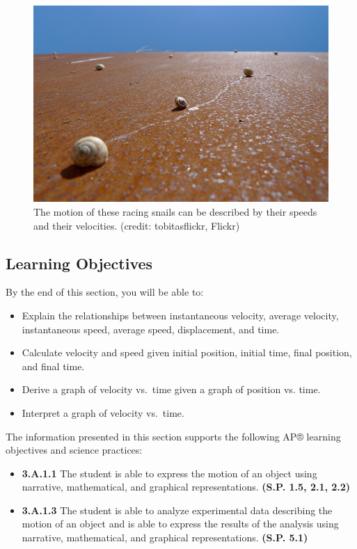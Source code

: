\documentclass[
]{book}
\providecommand{\tightlist}{%
  \setlength{\itemsep}{0pt}\setlength{\parskip}{0pt}}
\newenvironment{learning-objectives}{}{}
\begin{document}
\begin{figure}
\hypertarget{import-auto-id1690049}{%
\centering
\includegraphics{images/Picture 6.png}
\caption{The motion of these racing snails can be described by their speeds and
their velocities. (credit: tobitasflickr,
Flickr)}\label{import-auto-id1690049}
}
\end{figure}

\hypertarget{fs-id1037368}{}
\begin{learning-objectives}

\hypertarget{learning-objectives-2}{%
\subsection{Learning Objectives}\label{learning-objectives-2}}

By the end of this section, you will be able to:

\begin{itemize}
\tightlist
\item
  Explain the relationships between instantaneous velocity, average
  velocity, instantaneous speed, average speed, displacement, and
  time.
\item
  Calculate velocity and speed given initial position, initial time,
  final position, and final time.
\item
  Derive a graph of velocity vs.~time given a graph of position vs.
  time.
\item
  Interpret a graph of velocity vs.~time.
\end{itemize}

The information presented in this section supports the following AP®
learning objectives and science practices:

\begin{itemize}
\tightlist
\item
  \textbf{3.A.1.1} The student is able to express the motion of an object
  using narrative, mathematical, and graphical representations.
  \textbf{(S.P. 1.5, 2.1, 2.2)}
\item
  \textbf{3.A.1.3} The student is able to analyze experimental data
  describing the motion of an object and is able to express the
  results of the analysis using narrative, mathematical, and graphical
  representations. \textbf{(S.P. 5.1)}
\end{itemize}

\end{learning-objectives}
\end{document}
